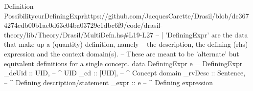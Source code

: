 \begin{haskell}{Definition Possibility}{curDefiningExpr}{https://github.com/JacquesCarette/Drasil/blob/dc3674274edb00b1ae0d63e04ba03729e1dbc6f9/code/drasil-theory/lib/Theory/Drasil/MultiDefn.hs\#L19-L27}
-- | 'DefiningExpr' are the data that make up a (quantity) definition, namely
--   the description, the defining (rhs) expression and the context domain(s).
--   These are meant to be 'alternate' but equivalent definitions for a single concept.
data DefiningExpr e = DefiningExpr {
  _deUid  :: UID,      -- ^ UID
  _cd     :: [UID],    -- ^ Concept domain
  _rvDesc :: Sentence, -- ^ Defining description/statement
  _expr   :: e         -- ^ Defining expression
}
\end{haskell}
